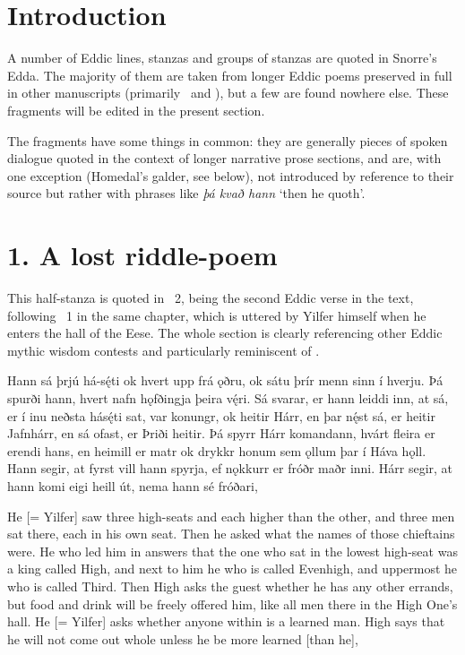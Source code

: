 
\section{Introduction}

A number of Eddic lines, stanzas and groups of stanzas are quoted in Snorre’s Edda.  The majority of them are taken from longer Eddic poems preserved in full in other manuscripts (primarily \Regius\ and \AM), but a few are found nowhere else.  These fragments will be edited in the present section.

The fragments have some things in common: they are generally pieces of spoken dialogue quoted in the context of longer narrative prose sections, and are, with one exception (Homedal’s galder, see below), not introduced by reference to their source but rather with phrases like \emph{þá kvað hann} ‘then he quoth’.

\sectionline

\section{1. A lost riddle-poem}

This half-stanza is quoted in \Gylfaginning\ 2, being the second Eddic verse in the text, following \Havamal\ 1 in the same chapter, which is uttered by Yilfer himself when he enters the hall of the Eese. The whole section is clearly referencing other Eddic mythic wisdom contests and particularly reminiscent of \Vafthrudnismal.

\bpg\bpa[0]Hann sá þrjú há-sę́ti ok hvert upp frá ǫðru, ok sátu þrír menn sinn í hverju. Þá spurði hann, hvert nafn hǫfðingja þeira vę́ri. Sá svarar, er hann leiddi inn, at sá, er í inu neðsta hásę́ti sat, var konungr, ok heitir Hárr, en þar nę́st sá, er heitir Jafnhárr, en sá ofast, er Þriði heitir. Þá spyrr Hárr komandann, hvárt fleira er erendi hans, en heimill er matr ok drykkr honum sem ǫllum þar í Háva hǫll. Hann segir, at fyrst vill hann spyrja, ef nǫkkurr er fróðr maðr inni. Hárr segir, at hann komi eigi heill út, nema hann sé fróðari,\epa

\bpb He [= Yilfer] saw three high-seats and each higher than the other, and three men sat there, each in his own seat. Then he asked what the names of those chieftains were. He who led him in answers that the one who sat in the lowest high-seat was a king called High, and next to him he who is called Evenhigh, and uppermost he who is called Third. Then High asks the guest whether he has any other errands, but food and drink will be freely offered him, like all men there in the High One’s hall. He [= Yilfer] asks whether anyone within is a learned man.  High says that he will not come out whole unless he be more learned [than he],\epb\epg

